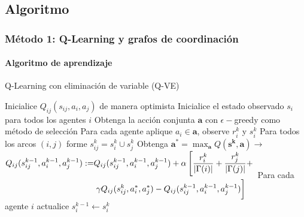 \documentclass[11pt]{beamer}
\begin{document}
\subsection{Algoritmo}
\begin{frame}[fragile]
\frametitle{Método 1: Q-Learning y grafos de coordinación}
\framesubtitle{Algoritmo de aprendizaje}

\begin{algorithm}[H]
\scriptsize %
\caption{Q-Learning con eliminación de variable (Q-VE)}\label{alg:Q-VE}
\begin{algorithmic}[]
\State Inicialice $Q_{ij}(s_{ij},a_i,a_j)$ de manera optimista
	\State Inicialice el estado observado $s_i$ para todos los agentes $i$
		\State Obtenga la acción conjunta $\mathbf{a}$ con $\epsilon-$greedy como método de selección
		\State Para cada agente aplique $a_i \in \mathbf{a}$, observe $r_i^k$ y $s_i^k$
		\State Para todos los arcos $(i,j)$ forme $s_{ij}^k=s_i^k \cup s_j^k$
		\State Obtenga $\mathbf{a}^*=\max_{\mathbf{a}}Q(\mathbf{s^k},\mathbf{a}) \rightarrow$  
		\Statex
			\State \scriptsize $\begin{aligned}  Q_{ij}(s_{ij}^{k-1},a_i^{k-1},a_j^{k-1}):=& Q_{ij}(s_{ij}^{k-1},a_i^{k-1},a_j^{k-1})+\alpha \left[ \frac{r_i^k}{|\Gamma(i)|}+\frac{r_j^k}{|\Gamma(j)|} + \right. \\ & \left. \gamma Q_{ij}(s_{ij}^k,a_i^*,a_j^*)-Q_{ij}(s_{ij}^{k-1},a_i^{k-1},a_j^{k-1}) {\vphantom{\frac{r_i}{|\Gamma(i)|}}} \right] \end{aligned}$\scriptsize
		\EndFor
		\State Para cada agente $i$ actualice $s_i^{k-1} \leftarrow s_i^k$
	\EndFor
\EndFor
\end{algorithmic}
\end{algorithm}
\end{frame}
\end{document}
